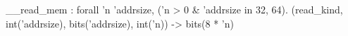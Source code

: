 __read_mem : forall 'n 'addrsize, ('n > 0 & 'addrsize in {32, 64}).
  (read_kind, int('addrsize), bits('addrsize), int('n)) -> bits(8 * 'n)
